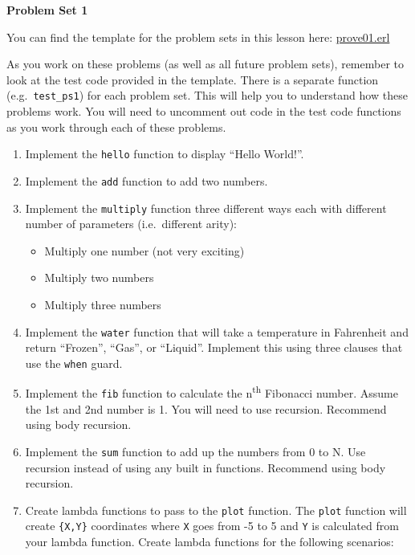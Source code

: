 \documentclass[
]{book}
\providecommand{\tightlist}{%
  \setlength{\itemsep}{0pt}\setlength{\parskip}{0pt}}
\begin{document}
\begin{problembox}

\textbf{Problem Set 1}

You can find the template for the problem sets in this lesson here: \href{proves/prove01.erl}{prove01.erl}

As you work on these problems (as well as all future problem sets), remember to look at the test code provided in the template. There is a separate function (e.g.~\texttt{test\_ps1}) for each problem set. This will help you to understand how these problems work. You will need to uncomment out code in the test code functions as you work through each of these problems.

\begin{enumerate}
\def\labelenumi{\arabic{enumi}.}
\tightlist
\item
  Implement the \texttt{hello} function to display ``Hello World!''.
\item
  Implement the \texttt{add} function to add two numbers.
\item
  Implement the \texttt{multiply} function three different ways each with different number of parameters (i.e.~different arity):

  \begin{itemize}
  \tightlist
  \item
    Multiply one number (not very exciting)
  \item
    Multiply two numbers
  \item
    Multiply three numbers
  \end{itemize}
\item
  Implement the \texttt{water} function that will take a temperature in Fahrenheit and return ``Frozen'', ``Gas'', or ``Liquid''. Implement this using three clauses that use the \texttt{when} guard.
\item
  Implement the \texttt{fib} function to calculate the n\textsuperscript{th} Fibonacci number. Assume the 1st and 2nd number is 1. You will need to use recursion. Recommend using body recursion.
\item
  Implement the \texttt{sum} function to add up the numbers from 0 to N. Use recursion instead of using any built in functions. Recommend using body recursion.
\item
  Create lambda functions to pass to the \texttt{plot} function. The \texttt{plot} function will create \texttt{\{X,Y\}} coordinates where \texttt{X} goes from -5 to 5 and \texttt{Y} is calculated from your lambda function. Create lambda functions for the following scenarios:


\end{enumerate}
\end{problembox}
\end{document}
